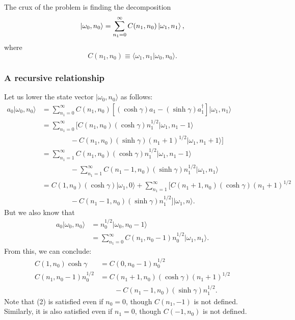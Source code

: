 \documentclass[12pt]{article}
\begin{document}
The crux of the problem is finding the decomposition
\[
	\ket{\omega_0,n_0} = \sum_{n_1=0}^{\infty} C(n_1,n_0)\ket{\omega_1,n_1},
\] 
where
\[
	C(n_1,n_0) \equiv \langle \omega_1,n_1|\omega_0,n_0\rangle .
\] 

\subsubsection*{A recursive relationship}
Let us lower the state vector $|\omega_0,n_0\rangle $ as follows:
\begin{align*}
	a_0|\omega_0,n_0\rangle &= \sum_{n_1=0}^{\infty} C(n_1,n_0)\left[(\cosh\gamma)a_1-(\sinh\gamma)a_1^{\dagger}\right] |\omega_1,n_1\rangle \\
				&= \sum_{n_1=0}^{\infty} \Big[ C(n_1,n_0)(\cosh\gamma)n_1^{1/2} |\omega_1,n_1-1\rangle \\ 
				& \qquad \qquad - C(n_1,n_0)(\sinh\gamma)(n_1+1)^{1/2}|\omega_1,n_1+1\rangle \Big] \\
				&= \sum_{n_1=1}^{\infty} C(n_1,n_0) (\cosh \gamma)n_1^{1/2} |\omega_1,n_1-1\rangle \\
				& \qquad \qquad - \sum_{n_1=1}^{\infty} C(n_1-1,n_0)(\sinh\gamma)n_1^{1/2}|\omega_1,n_1\rangle  \\
				&= C(1,n_0)(\cosh\gamma)|\omega_1,0\rangle  + \sum_{n_1=1}^{\infty}\Big[ C(n_1+1,n_0)(\cosh\gamma)(n_1+1)^{1/2}\\
				& \qquad \qquad -C(n_1-1,n_0)(\sinh\gamma) n_1^{1/2}\Big]|\omega_1,n\rangle .
\end{align*}
But we also know that
\begin{align*}
	a_0|\omega_0,n_0\rangle &= n_0^{1/2} |\omega_0,n_{0}-1\rangle \\
				&= \sum_{n_1=0}^{\infty} C(n_1,n_0-1)n_0^{1/2}|\omega_1,n_1\rangle .
\end{align*}
From this, we can conclude:
\begin{align}
	C(1,n_0)\cosh\gamma &= C(0,n_0-1)n_0^{1/2} \\
	C(n_1,n_0-1)n_0^{1/2} &= C(n_1+1,n_0) (\cosh \gamma) (n_1+1)^{1/2} \nonumber \\
			      & \qquad - C(n_1-1,n_0)(\sinh \gamma)n_1^{1/2}.
\end{align}
Note that (2) is satisfied even if $n_0=0$, though $C(n_1,-1)$ is not defined. Similarly, it is also satisfied even if $n_1=0$, though $C(-1,n_0)$ is not defined.
\end{document}
